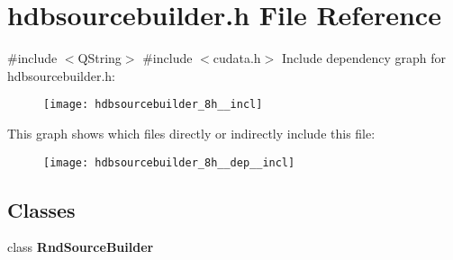\section{hdbsourcebuilder.\+h File Reference}
\label{hdbsourcebuilder_8h}
{\ttfamily \#include $<$Q\+String$>$}\newline
{\ttfamily \#include $<$cudata.\+h$>$}\newline
Include dependency graph for hdbsourcebuilder.\+h\+:
\nopagebreak
\begin{figure}[H]
\begin{center}
\leavevmode
\texttt{[image: hdbsourcebuilder\_8h\_\_incl]}
\end{center}
\end{figure}
This graph shows which files directly or indirectly include this file\+:
\nopagebreak
\begin{figure}[H]
\begin{center}
\leavevmode
\texttt{[image: hdbsourcebuilder\_8h\_\_dep\_\_incl]}
\end{center}
\end{figure}
\subsection*{Classes}
\begin{DoxyCompactItemize}
\item 
class \textbf{ Rnd\+Source\+Builder}
\end{DoxyCompactItemize}
